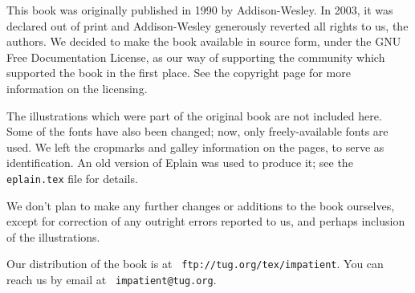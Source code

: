 \baselineskip

 This book was originally
published in 1990 by Addison-Wesley.  In 2003, it was declared out of
print and Addison-Wesley generously reverted all rights to us, the
authors.  We decided to make the book available in source form, under
the GNU Free Documentation License, as our way of supporting the
community which supported the book in the first place.  See the
copyright page for more information on the licensing.

The illustrations which were part of the original book are not included
here.  Some of the fonts have also been changed; now, only
freely-available fonts are used.  We left the cropmarks and galley
information on the pages, to serve as identification.  An old version of
Eplain was used to produce it; see the {\tt eplain.tex} file for
details.

We don't plan to make any further changes or additions to the book
ourselves, except for correction of any outright errors reported to us,
and perhaps inclusion of the illustrations.

Our distribution of the book is at {\tt
ftp://tug.org/tex/impatient}.  You can reach us by email at {\tt
impatient@tug.org}.

\pagebreak
\byebye
